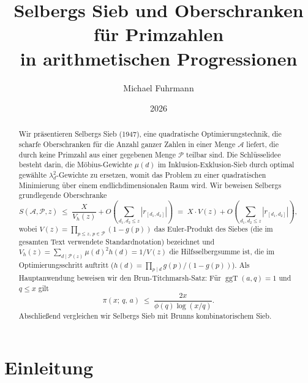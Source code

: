 \documentclass[12pt,a4paper]{amsart}
\theoremstyle{definition}
\DeclareMathOperator{\ggT}{ggT}
\begin{document}

\title{Selbergs Sieb und Oberschranken für Primzahlen\\
       in arithmetischen Progressionen}

\author{Michael Fuhrmann}
\address{Specialist Mathematics Project, Build 74}
\date{2026}

\begin{abstract}
Wir präsentieren Selbergs Sieb (1947), eine quadratische Optimierungstechnik,
die scharfe Oberschranken für die Anzahl ganzer Zahlen in einer Menge
$\mathcal{A}$ liefert, die durch keine Primzahl aus einer gegebenen Menge
$\mathcal{P}$ teilbar sind.  Die Schlüsselidee besteht darin, die
Möbius-Gewichte $\mu(d)$ im Inklusion-Exklusion-Sieb durch optimal gewählte
$\lambda_d^2$-Gewichte zu ersetzen, womit das Problem zu einer quadratischen
Minimierung über einem endlichdimensionalen Raum wird.  Wir beweisen Selbergs
grundlegende Oberschranke
\[
  S(\mathcal{A},\mathcal{P},z)
  \;\leq\; \frac{X}{V_h(z)} + O\!\left(\sum_{d_1,d_2 \leq z} |r_{[d_1,d_2]}|\right)
  \;=\; X \cdot V(z) + O\!\left(\sum_{d_1,d_2 \leq z} |r_{[d_1,d_2]}|\right),
\]
wobei $V(z) = \prod_{p \leq z,\,p \in \mathcal{P}}(1-g(p))$ das Euler-Produkt
des Siebes (die im gesamten Text verwendete Standardnotation) bezeichnet und
$V_h(z) = \sum_{d \mid \mathcal{P}(z)} \mu(d)^2 h(d) = 1/V(z)$ die
Hilfsselbergsumme ist, die im Optimierungsschritt auftritt
($h(d) = \prod_{p \mid d} g(p)/(1-g(p))$).
Als Hauptanwendung beweisen wir den
Brun-Titchmarsh-Satz: Für $\ggT(a,q) = 1$ und $q \leq x$ gilt
\[
  \pi(x;\,q,\,a) \;\leq\; \frac{2x}{\phi(q)\log(x/q)}.
\]
Abschließend vergleichen wir Selbergs Sieb mit Brunns kombinatorischem Sieb.
\end{abstract}

\maketitle
\tableofcontents

\section{Einleitung}
\end{document}
